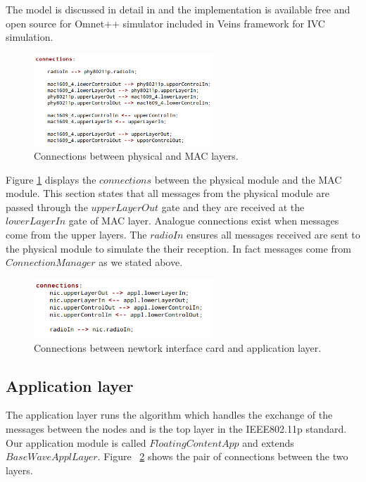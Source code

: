 The model is discussed in detail in \cite{eckhoff2012multi} and the
implementation is available free and open source for Omnet++ simulator included
in Veins framework for IVC simulation.

\begin{figure}
	\centering
	\includegraphics[width=0.6\textwidth]{img/nic80211p_connections}
	\caption{Connections between physical and MAC layers.}
	\label{fig:nic80211p_connections}
\end{figure}
 
Figure \ref{fig:nic80211p_connections} displays the $connections$ between
the physical module and the MAC module. This section states that all messages
from the physical module are passed through the $upperLayerOut$ gate and they
are received at the $lowerLayerIn$ gate of MAC layer. Analogue connections exist
when messages come from the upper layers. The $radioIn$ ensures all messages
received are sent to the physical module to simulate the their reception. In
fact messages come from $ConnectionManager$ as we stated above.

\begin{figure}[t]
	\centering
	\includegraphics[width=0.6\textwidth]{img/appl_connections}
	\caption{Connections between newtork interface card and application
	layer.}
	\label{fig:appl_connections}
\end{figure}

\subsection{Application layer}

The application layer runs the algorithm which handles the exchange of the
messages between the nodes and is the top layer in the IEEE802.11p standard. Our
application module is called $FloatingContentApp$ and extends
$BaseWaveApplLayer$. Figure ~\ref{fig:appl_connections} shows the pair of
connections between the two layers.

